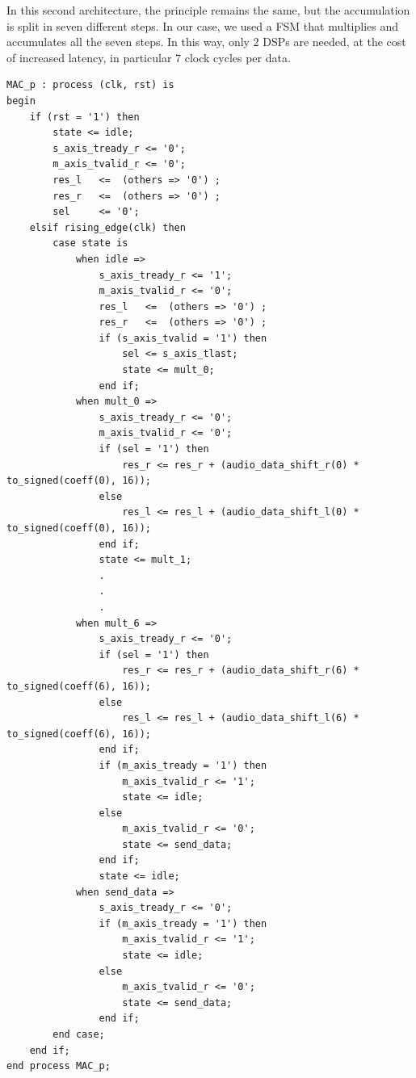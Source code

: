 \documentclass[11pt, a4paper]{article}
\begin{document}
In this second architecture, the principle remains the same, but the accumulation is split in seven different steps. In our case, we used a FSM that multiplies and accumulates all the seven steps.  
In this way, only 2 DSPs are needed, at the cost of increased latency, in particular 7 clock cycles per data.

\begin{lstlisting}[style={VHDL-style}]
MAC_p : process (clk, rst) is
begin
    if (rst = '1') then
        state <= idle;
        s_axis_tready_r <= '0';
        m_axis_tvalid_r <= '0';
        res_l   <=  (others => '0') ;
        res_r   <=  (others => '0') ;
        sel     <= '0';
    elsif rising_edge(clk) then
        case state is
            when idle =>
                s_axis_tready_r <= '1';
                m_axis_tvalid_r <= '0';
                res_l   <=  (others => '0') ;
                res_r   <=  (others => '0') ;
                if (s_axis_tvalid = '1') then
                    sel <= s_axis_tlast;
                    state <= mult_0;
                end if;
            when mult_0 =>
                s_axis_tready_r <= '0';
                m_axis_tvalid_r <= '0';
                if (sel = '1') then
                    res_r <= res_r + (audio_data_shift_r(0) * to_signed(coeff(0), 16));
                else
                    res_l <= res_l + (audio_data_shift_l(0) * to_signed(coeff(0), 16));
                end if;
                state <= mult_1;
                .
                .
                .
            when mult_6 =>
                s_axis_tready_r <= '0';
                if (sel = '1') then
                    res_r <= res_r + (audio_data_shift_r(6) * to_signed(coeff(6), 16));
                else
                    res_l <= res_l + (audio_data_shift_l(6) * to_signed(coeff(6), 16));
                end if;
                if (m_axis_tready = '1') then
                    m_axis_tvalid_r <= '1';
                    state <= idle;
                else
                    m_axis_tvalid_r <= '0';
                    state <= send_data;
                end if;
                state <= idle;
            when send_data =>
                s_axis_tready_r <= '0';
                if (m_axis_tready = '1') then
                    m_axis_tvalid_r <= '1';
                    state <= idle;
                else
                    m_axis_tvalid_r <= '0';
                    state <= send_data;
                end if;
        end case;
    end if;
end process MAC_p;
\end{lstlisting}
\end{document}
